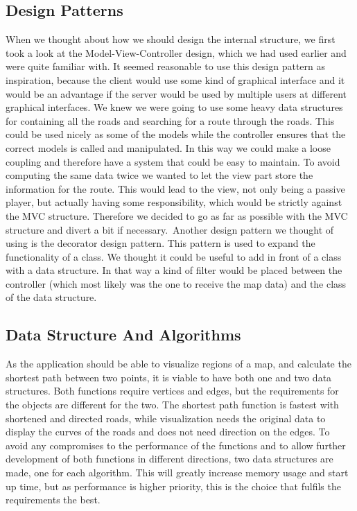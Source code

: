 \documentclass[a4paper,10pt,titlepage]{article}
\begin{document}
			\subsection{Design Patterns}
			When we thought about how we should design the internal structure, we first took a look at the Model-View-Controller design, which we had used earlier and were quite familiar with. It seemed reasonable to use this design pattern as inspiration, because the client would use some kind of graphical interface and it would be an advantage if the server would be used by multiple users at different graphical interfaces. We knew we were going to use some heavy data structures for containing all the roads and searching for a route through the roads. This could be used nicely as some of the models while the controller ensures that the correct models is called and manipulated. In this way we could make a loose coupling and therefore have a system that could be easy to maintain.
To avoid computing the same data twice we wanted to let the view part store the information for the route. This would lead to the view, not only being a passive player, but actually having some responsibility, which would be strictly against the MVC structure. Therefore we decided to go as far as possible with the MVC structure and divert a bit if necessary.\
Another design pattern we thought of using is the decorator design pattern. This pattern is used to expand the functionality of a class. We thought it could be useful to add in front of a class with a data structure. In that way a kind of filter would be placed between the controller (which most likely was the one to receive the map data) and the class of the data structure.


			\subsection{Data Structure And Algorithms}
			As the application should be able to visualize regions of a map, and calculate the shortest path between two points, it is viable to have both one and two data structures. Both functions require vertices and edges, but the requirements for the objects are different for the two. The shortest path function is fastest with shortened and directed roads, while visualization needs the original data to display the curves of the roads and does not need direction on the edges. To avoid any compromises to the performance of the functions and to allow further development of both functions in different directions, two data structures are made, one for each algorithm. This will greatly increase memory usage and start up time, but as performance is higher priority, this is the choice that fulfils the requirements the best.
\end{document}
